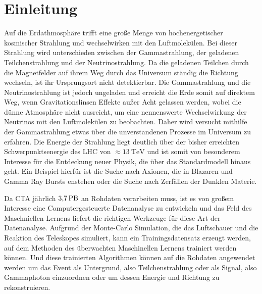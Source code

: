 \chapter{Einleitung}

Auf die Erdathmosphäre trifft eine große Menge von hochenergetischer kosmischer Strahlung und wechselwirken mit den Luftmolekülen.
Bei dieser Strahlung wird unterschieden zwischen der Gammastrahlung, der geladenen Teilchenstrahlung und der Neutrinostrahlung.
Da die geladenen Teilchen durch die Magnetfelder auf ihrem Weg durch das Universum ständig die Richtung wechseln, ist ihr
Ursprungsort nicht detektierbar.
Die Gammastrahlung und die Neutrinostrahlung ist jedoch ungeladen und erreicht die Erde somit auf
direktem Weg, wenn Gravitationslinsen Effekte außer Acht gelassen werden, wobei die dünne Atmosphäre nicht ausreicht, um eine nennenswerte
Wechselwirkung der Neutrinos mit den Luftmolekülen zu beobachten. Daher wird versucht mithilfe der Gammastrahlung etwas über die unverstandenen
Prozesse im Universum zu erfahren. Die Energie der Strahlung liegt deutlich über der
bisher erreichten Schwerpunktsenergie des LHC von $\approx\SI{13}{\tera\eV}$\cite{LHC} und ist somit von besonderem Interesse für
die Entdeckung neuer Physik, die über das Standardmodell hinaus geht. Ein Beispiel hierfür ist die Suche nach Axionen, die in Blazaren
und Gamma Ray Bursts enstehen oder die Suche nach Zerfällen der Dunklen Materie.

Da CTA jährlich $\SI{3.7}{\peta\byte}$\cite{Rohdaten} an Rohdaten
verarbeiten muss, ist es von großem Interesse eine Computergesteuerte Datenanalyse zu entwickeln und das Feld des Maschniellen Lernens liefert
die richtigen Werkzeuge für diese Art der Datenanalyse. Aufgrund der Monte-Carlo Simulation, die das Luftschauer und die Reaktion des
Teleskopes simuliert, kann ein Trainingsdatensatz erzeugt werden, auf dem Methoden des überwachten Maschinellen Lernens trainiert werden können.
Und diese trainierten Algorithmen können auf die Rohdaten angewendet werden um das Event als Untergrund, also Teilchenstrahlung oder als
Signal, also Gammaphoton einzuordnen oder um dessen Energie und Richtung zu rekonstruieren.

